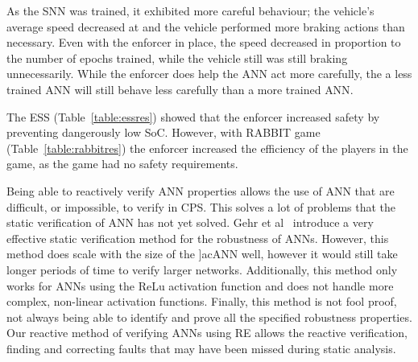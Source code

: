 As the \ac{SNN} was trained, it exhibited more careful behaviour; the vehicle's average speed decreased at and the vehicle performed more braking actions than necessary.
Even with the enforcer in place, the speed decreased in proportion to the number of epochs trained, while the vehicle still was still braking unnecessarily.
While the enforcer does help the \ac{ANN} act more carefully, the a less trained \ac{ANN} will still behave less carefully than a more trained \ac{ANN}.

The \ac{ESS} (Table~\ref{table:essres}) showed that the enforcer increased safety by preventing dangerously low \acf{SoC}.
However, with RABBIT game (Table~\ref{table:rabbitres}) the enforcer increased the efficiency of the players in the game, as the game had no safety requirements.

Being able to reactively verify \ac{ANN} properties allows the use of \ac{ANN} that are difficult, or impossible, to verify in \ac{CPS}.
This solves a lot of problems that the static verification of \ac{ANN} has not yet solved.
Gehr et al~\cite{Gehr2018AI2SA} introduce a very effective static verification method for the robustness of \acp{ANN}.
However, this method does scale with the size of the ]ac{ANN} well, however it would still take longer periods of time to verify larger networks.
Additionally, this method only works for \acp{ANN} using the ReLu activation function and does not handle more complex, non-linear activation functions.
Finally, this method is not fool proof, not always being able to identify and prove all the specified robustness properties. 
Our reactive method of verifying \acp{ANN} using \ac{RE} allows the reactive verification, finding and correcting faults that may have been missed during static analysis.